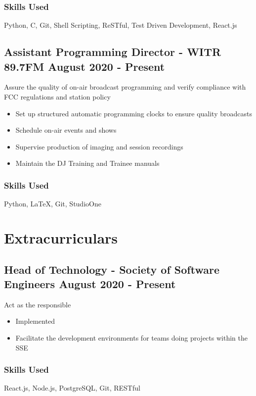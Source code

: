 \documentclass[11pt, letterpaper]{article}
\begin{document}
            \subsubsection{Skills Used}
                Python, C, Git, Shell Scripting, ReSTful, Test Driven Development, React.js
        \subsection{Assistant Programming Director - WITR 89.7FM \hfill August 2020 - Present}
            Assure the quality of on-air broadcast programming and verify compliance with FCC
            regulations and station policy
            \begin{itemize}[nosep]
                \item Set up structured automatic programming clocks to ensure quality broadcasts
                \item Schedule on-air events and shows
                \item Supervise production of imaging and session recordings
                \item Maintain the DJ Training and Trainee manuals
            \end{itemize}
            \subsubsection{Skills Used}
                Python, LaTeX, Git, StudioOne

    \section{Extracurriculars}
        \subsection{Head of Technology - Society of Software Engineers \hfill August 2020 - Present}
            Act as the responsible 
            \begin{itemize}[nosep]
                \item Implemented
                \item Facilitate the development environments for teams doing projects within the SSE
            \end{itemize}
            \subsubsection{Skills Used}
                React.js, Node.js, PostgreSQL, Git, RESTful
\end{document}
